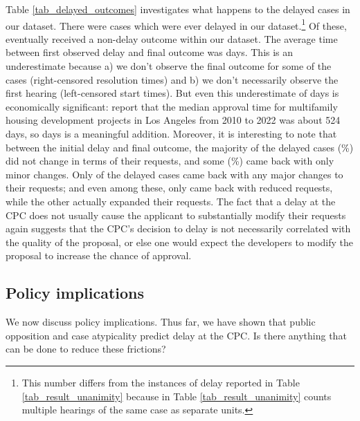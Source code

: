 Table \ref{tab_delayed_outcomes} investigates what happens to the delayed cases in our dataset. There were  cases which were ever delayed in our dataset.\footnote{This number differs from the  instances of delay reported in Table \ref{tab_result_unanimity} because in Table \ref{tab_result_unanimity} counts multiple hearings of the same case as separate units.} Of these,  eventually received a non-delay outcome within our dataset. The average time between first observed delay and final outcome was  days. This is an underestimate because a) we don't observe the final outcome for some of the cases (right-censored resolution times) and b) we don't necessarily observe the first hearing (left-censored start times). But even this underestimate of  days is economically significant: \citet{gabrielkung2025} report that the median approval time for multifamily housing development projects in Los Angeles from 2010 to 2022 was about 524 days, so  days is a meaningful addition. Moreover, it is interesting to note that between the initial delay and final outcome, the majority of the delayed cases (\%) did not change in terms of their requests, and some (\%) came back with only minor changes. Only  of the delayed cases came back with any major changes to their requests; and even among these, only  came back with reduced requests, while the other  actually expanded their requests. The fact that a delay at the CPC does not usually cause the applicant to substantially modify their requests again suggests that the CPC's decision to delay is not necessarily correlated with the quality of the proposal, or else one would expect the developers to modify the proposal to increase the chance of approval.

\subsection{Policy implications}

We now discuss policy implications. Thus far, we have shown that public opposition and case atypicality predict delay at the CPC. Is there anything that can be done to reduce these frictions? 

